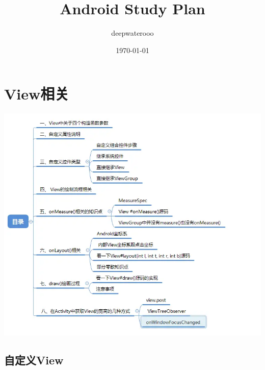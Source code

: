 \documentclass[9pt, b5paper]{article}
\author{deepwaterooo}
\date{\today}
\title{Android Study Plan}
\begin{document}
\maketitle
\tableofcontents


\section{View相关}
\label{sec-1}

\includegraphics[width=.9\linewidth]{./pic/viewas.png}

\subsection{自定义View}
\label{sec-1-1}
\end{document}
